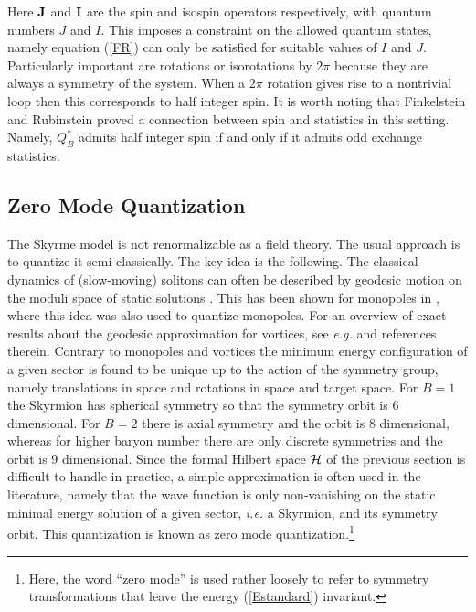 \documentclass[a4paper,12pt]{article}
\begin{document}
%
Here ${\bf J}$ and ${\bf I}$ are the spin and isospin operators 
respectively, with quantum numbers $J$ and $I$.
This imposes a constraint on the allowed quantum states, namely 
equation (\ref{FR}) can only be satisfied for suitable values of 
$I$ and $J$. 
Particularly important are 
rotations or isorotations by $2 \pi$ because they are always a 
symmetry of the system. When a $2 \pi$ rotation gives rise to a 
nontrivial loop then this corresponds to half integer spin.
%
It is worth noting that Finkelstein and Rubinstein 
proved a connection between spin and statistics in this setting. 
Namely, $Q_B^*$ admits half integer spin if and only if it admits odd 
exchange statistics.

\subsection{Zero Mode Quantization}
\label{Zero-mode}


The Skyrme model is not renormalizable as a field theory. The usual 
approach is to quantize it semi-classically. The key idea is the 
following. The classical dynamics of (slow-moving) solitons can often be 
described by geodesic motion on the moduli space of static solutions 
\cite{Manton:1982mp}. This has 
been shown for monopoles in \cite{Gibbons:1986df}, where this idea 
was also used to quantize monopoles. For an overview of exact results 
about the geodesic approximation for vortices, see {\it e.g.} 
\cite{Manton:2002wb} and references therein. 
Contrary to monopoles and vortices the minimum energy configuration of a
given sector is found to be unique up to the action of the symmetry
group, namely translations in space and rotations 
in space and target space. For $B=1$ the Skyrmion has spherical 
symmetry so that the symmetry orbit is 6 dimensional. For $B=2$ there is 
axial symmetry and the orbit is $8$ dimensional, whereas for higher 
baryon number there are only discrete symmetries and the orbit is 9 
dimensional. 
Since the formal Hilbert space ${\cal H}$ of the previous section is 
difficult to handle in practice,  a simple approximation 
is often used in the literature, namely that the 
wave function is only non-vanishing on the static minimal energy solution
of a given sector, {\it i.e.} a Skyrmion, and its symmetry orbit.
This quantization is known as zero mode 
quantization.\footnote{Here, the word ``zero mode'' is used rather loosely 
to refer to symmetry transformations that leave the energy 
(\ref{Estandard}) invariant.}
\end{document}
